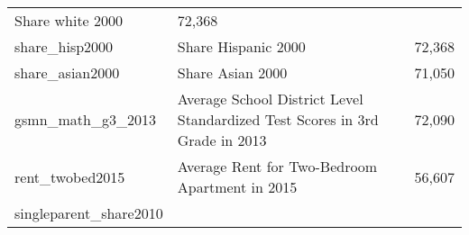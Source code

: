 \documentclass[]{book}
\begin{document}
\begin{longtable}[]{@{}lll@{}}
\begin{minipage}[t]{0.04\columnwidth}
Share white 2000\strut
\end{minipage} & \begin{minipage}[t]{0.04\columnwidth}\raggedright\strut
72,368\strut
\end{minipage}\tabularnewline
\begin{minipage}[t]{0.04\columnwidth}\raggedright\strut
share\_hisp2000\strut
\end{minipage} & \begin{minipage}[t]{0.04\columnwidth}\raggedright\strut
Share Hispanic 2000\strut
\end{minipage} & \begin{minipage}[t]{0.04\columnwidth}\raggedright\strut
72,368\strut
\end{minipage}\tabularnewline
\begin{minipage}[t]{0.04\columnwidth}\raggedright\strut
share\_asian2000\strut
\end{minipage} & \begin{minipage}[t]{0.04\columnwidth}\raggedright\strut
Share Asian 2000\strut
\end{minipage} & \begin{minipage}[t]{0.04\columnwidth}\raggedright\strut
71,050\strut
\end{minipage}\tabularnewline
\begin{minipage}[t]{0.04\columnwidth}\raggedright\strut
gsmn\_math\_g3\_2013\strut
\end{minipage} & \begin{minipage}[t]{0.04\columnwidth}\raggedright\strut
Average School District Level Standardized Test Scores in 3rd Grade in
2013\strut
\end{minipage} & \begin{minipage}[t]{0.04\columnwidth}\raggedright\strut
72,090\strut
\end{minipage}\tabularnewline
\begin{minipage}[t]{0.04\columnwidth}\raggedright\strut
rent\_twobed2015\strut
\end{minipage} & \begin{minipage}[t]{0.04\columnwidth}\raggedright\strut
Average Rent for Two-Bedroom Apartment in 2015\strut
\end{minipage} & \begin{minipage}[t]{0.04\columnwidth}\raggedright\strut
56,607\strut
\end{minipage}\tabularnewline
\begin{minipage}[t]{0.04\columnwidth}\raggedright\strut
singleparent\_share2010\strut

\end{minipage}
\end{longtable}
\end{document}
